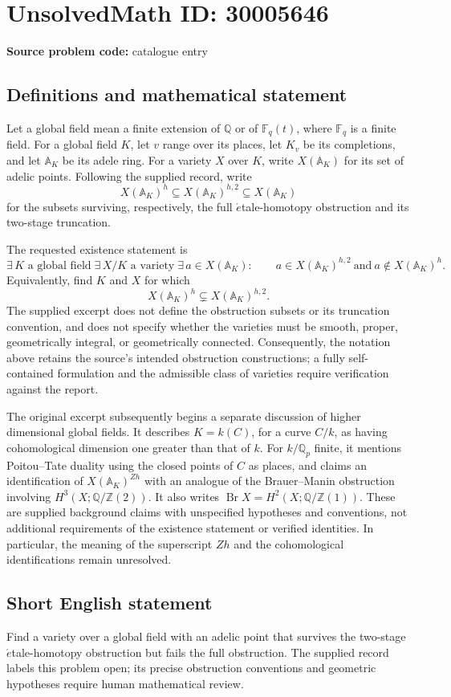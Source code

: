 \documentclass[11pt]{article}
\newcommand{\Z}{\mathbb{Z}}
\newcommand{\Q}{\mathbb{Q}}
\newcommand{\F}{\mathbb{F}}
\newcommand{\A}{\mathbb{A}}
\begin{document}
\section*{UnsolvedMath ID: 30005646}
\textbf{Source problem code:} catalogue entry
\subsection{Definitions and mathematical statement}
Let a global field mean a finite extension of \(\Q\) or of \(\F_q(t)\), where \(\F_q\) is a finite field. For a global field \(K\), let \(v\) range over its places, let \(K_v\) be its completions, and let \(\A_K\) be its adele ring. For a variety \(X\) over \(K\), write \(X(\A_K)\) for its set of adelic points. Following the supplied record, write
\[
X(\A_K)^h\subseteq X(\A_K)^{h,2}\subseteq X(\A_K)
\]
for the subsets surviving, respectively, the full \(\acute{e}\)tale-homotopy obstruction and its two-stage truncation.

The requested existence statement is
\[
\exists\,K\text{ a global field}\;\exists\,X/K\text{ a variety}\;\exists\,a\in X(\A_K):\qquad
 a\in X(\A_K)^{h,2}\ \text{and}\ a\notin X(\A_K)^h.
\]
Equivalently, find \(K\) and \(X\) for which
\[
X(\A_K)^h\subsetneq X(\A_K)^{h,2}.
\]
The supplied excerpt does not define the obstruction subsets or its truncation convention, and does not specify whether the varieties must be smooth, proper, geometrically integral, or geometrically connected. Consequently, the notation above retains the source's intended obstruction constructions; a fully self-contained formulation and the admissible class of varieties require verification against the report.

The original excerpt subsequently begins a separate discussion of higher dimensional global fields. It describes \(K=k(C)\), for a curve \(C/k\), as having cohomological dimension one greater than that of \(k\). For \(k/\Q_p\) finite, it mentions Poitou--Tate duality using the closed points of \(C\) as places, and claims an identification of \(X(\A_K)^{Zh}\) with an analogue of the Brauer--Manin obstruction involving \(H^3(X;\Q/\Z(2))\). It also writes \(\operatorname{Br}X=H^2(X;\Q/\Z(1))\). These are supplied background claims with unspecified hypotheses and conventions, not additional requirements of the existence statement or verified identities. In particular, the meaning of the superscript \(Zh\) and the cohomological identifications remain unresolved.
\subsection{Short English statement}
Find a variety over a global field with an adelic point that survives the two-stage \(\acute{e}\)tale-homotopy obstruction but fails the full obstruction. The supplied record labels this problem open; its precise obstruction conventions and geometric hypotheses require human mathematical review.
\end{document}

